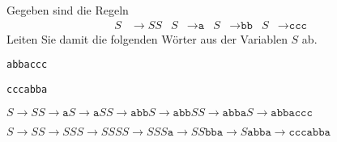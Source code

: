 Gegeben sind die Regeln
\begin{align*}
S&\to SS
&
S&\to \texttt{a}
&
S&\to \texttt{bb}
&
S&\to \texttt{ccc}
\end{align*}
Leiten Sie damit die folgenden Wörter aus der Variablen $S$ ab.
\begin{teilaufgaben}
\item \texttt{abbaccc}
\item \texttt{cccabba}
\end{teilaufgaben}


\begin{loesung}
\begin{teilaufgaben}
\item
\(
S
\to
SS
\to
\texttt{a}S 
\to
\texttt{a}SS
\to
\texttt{abb}S
\to
\texttt{abb}SS
\to
\texttt{abba}S
\to
\texttt{abbaccc}
\)
\item
\(
S\to SS \to SSS \to SSSS
\to
SSS\texttt{a}
\to
SS\texttt{bba}
\to
S\texttt{abba}
\to
\texttt{cccabba}
\)
\qedhere
\end{teilaufgaben}
\end{loesung}
